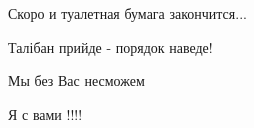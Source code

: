 \begin{itemize}
 
Скоро и туалетная бумага закончится...

 
Талібан прийде - порядок наведе!

 
Мы без Вас несможем

 
Я с вами !!!!


\end{itemize}

